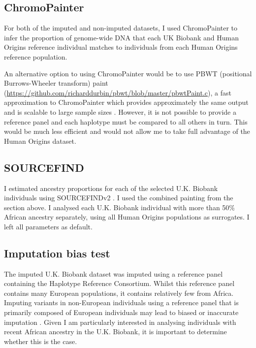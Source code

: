 \subsection{ChromoPainter}

For both of the imputed and non-imputed datasets, I used ChromoPainter to infer the proportion of genome-wide DNA that each UK Biobank and Human Origins reference individual matches to individuals from each Human Origins reference population. 

An alternative option to using ChromoPainter would be to use PBWT (positional Burrows-Wheeler transform) paint (\url{https://github.com/richarddurbin/pbwt/blob/master/pbwtPaint.c}), a fast approximation to ChromoPainter which provides approximately the same output and is scalable to large sample sizes \cite{byrne2020dutch}. However, it is not possible to provide a reference panel and each haplotype must be compared to all others in turn. This would be much less efficient and would not allow me to take full advantage of the Human Origins dataset. 

\subsection{SOURCEFIND}

I estimated ancestry proportions for each of the selected U.K. Biobank individuals using SOURCEFINDv2 \cite{Chacon-Duque2018}. I used the combined painting from the section above. I analysed each U.K. Biobank individual with more than 50\% African ancestry separately, using all Human Origins populations as surrogates. I left all parameters as default. 

\subsection{Imputation bias test} \label{sec:ImputationBiasTest}

The imputed U.K. Biobank dataset was imputed using a reference panel containing the Haplotype Reference Consortium. Whilst this reference panel contains many European populations, it contains relatively few from Africa. Imputing variants in non-European individuals using a reference panel that is primarily composed of European individuals may lead to biased or inaccurate imputation \cite{huang2011haplotype}. Given I am particularly interested in analysing individuals with recent African ancestry in the U.K. Biobank, it is important to determine whether this is the case.  

